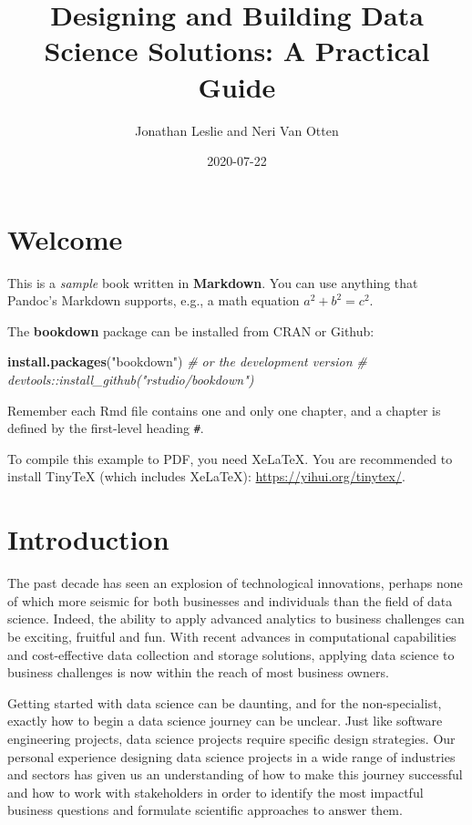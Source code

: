 \documentclass[
]{book}
\title{Designing and Building Data Science Solutions: A Practical Guide}
\author{Jonathan Leslie and Neri Van Otten}
\date{2020-07-22}
\newenvironment{Shaded}{\begin{snugshade}}{\end{snugshade}}
\newcommand{\CommentTok}[1]{\textcolor[rgb]{0.56,0.35,0.01}{\textit{#1}}}
\newcommand{\KeywordTok}[1]{\textcolor[rgb]{0.13,0.29,0.53}{\textbf{#1}}}
\newcommand{\NormalTok}[1]{#1}
\newcommand{\StringTok}[1]{\textcolor[rgb]{0.31,0.60,0.02}{#1}}
\begin{document}
\maketitle

{
\setcounter{tocdepth}{1}
\tableofcontents
}
\hypertarget{welcome}{%
\chapter*{Welcome}\label{welcome}}

This is a \emph{sample} book written in \textbf{Markdown}. You can use anything that Pandoc's Markdown supports, e.g., a math equation \(a^2 + b^2 = c^2\).

The \textbf{bookdown} package can be installed from CRAN or Github:

\begin{Shaded}
\begin{Highlighting}[]
\KeywordTok{install.packages}\NormalTok{(}\StringTok{"bookdown"}\NormalTok{)}
\CommentTok{# or the development version}
\CommentTok{# devtools::install_github("rstudio/bookdown")}
\end{Highlighting}
\end{Shaded}

Remember each Rmd file contains one and only one chapter, and a chapter is defined by the first-level heading \texttt{\#}.

To compile this example to PDF, you need XeLaTeX. You are recommended to install TinyTeX (which includes XeLaTeX): \url{https://yihui.org/tinytex/}.

\hypertarget{introduction}{%
\chapter{Introduction}\label{introduction}}

The past decade has seen an explosion of technological innovations, perhaps none of which more seismic for both businesses and individuals than the field of data science. Indeed, the ability to apply advanced analytics to business challenges can be exciting, fruitful and fun. With recent advances in computational capabilities and cost-effective data collection and storage solutions, applying data science to business challenges is now within the reach of most business owners.

Getting started with data science can be daunting, and for the non-specialist, exactly how to begin a data science journey can be unclear. Just like software engineering projects, data science projects require specific design strategies. Our personal experience designing data science projects in a wide range of industries and sectors has given us an understanding of how to make this journey successful and how to work with stakeholders in order to identify the most impactful business questions and formulate scientific approaches to answer them.
\end{document}
